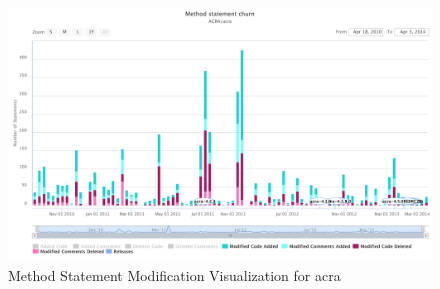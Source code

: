 \begin{landscape}
\thispagestyle{empty}
 \begin{figure}
  \centering
        \includegraphics[width=1.5\textwidth]{images/statement_modified}
    \caption{Method Statement Modification Visualization for acra}
    \label{fig:statement_modified_visual_acra}
 \end{figure}
\end{landscape}
\thispagestyle{plain}

